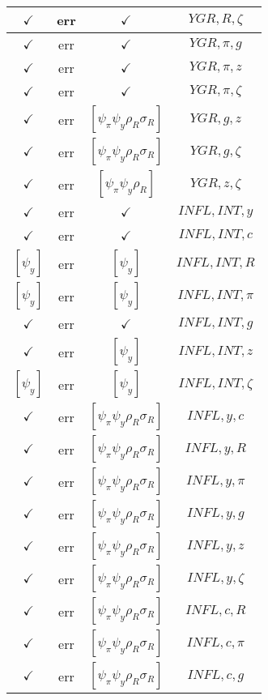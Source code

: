 \documentclass[a4paper,10pt]{article}
\begin{document}
\begin{longtable}{|c|c|c|c|}
\hline
$\checkmark$ & err & $\checkmark$ & ${YGR},{R},{\zeta}$ \\
\hline
$\checkmark$ & err & $\checkmark$ & ${YGR},{\pi},{g}$ \\
\hline
$\checkmark$ & err & $\checkmark$ & ${YGR},{\pi},{z}$ \\
\hline
$\checkmark$ & err & $\checkmark$ & ${YGR},{\pi},{\zeta}$ \\
\hline
$\checkmark$ & err & $[\psi_\pi \psi_y \rho_R \sigma_R ]$ & ${YGR},{g},{z}$ \\
\hline
$\checkmark$ & err & $[\psi_\pi \psi_y \rho_R \sigma_R ]$ & ${YGR},{g},{\zeta}$ \\
\hline
$\checkmark$ & err & $[\psi_\pi \psi_y \rho_R ]$ & ${YGR},{z},{\zeta}$ \\
\hline
$\checkmark$ & err & $\checkmark$ & ${INFL},{INT},{y}$ \\
\hline
$\checkmark$ & err & $\checkmark$ & ${INFL},{INT},{c}$ \\
\hline
$[\psi_y ]$ & err & $[\psi_y ]$ & ${INFL},{INT},{R}$ \\
\hline
$[\psi_y ]$ & err & $[\psi_y ]$ & ${INFL},{INT},{\pi}$ \\
\hline
$\checkmark$ & err & $\checkmark$ & ${INFL},{INT},{g}$ \\
\hline
$\checkmark$ & err & $[\psi_y ]$ & ${INFL},{INT},{z}$ \\
\hline
$[\psi_y ]$ & err & $[\psi_y ]$ & ${INFL},{INT},{\zeta}$ \\
\hline
$\checkmark$ & err & $[\psi_\pi \psi_y \rho_R \sigma_R ]$ & ${INFL},{y},{c}$ \\
\hline
$\checkmark$ & err & $[\psi_\pi \psi_y \rho_R \sigma_R ]$ & ${INFL},{y},{R}$ \\
\hline
$\checkmark$ & err & $[\psi_\pi \psi_y \rho_R \sigma_R ]$ & ${INFL},{y},{\pi}$ \\
\hline
$\checkmark$ & err & $[\psi_\pi \psi_y \rho_R \sigma_R ]$ & ${INFL},{y},{g}$ \\
\hline
$\checkmark$ & err & $[\psi_\pi \psi_y \rho_R \sigma_R ]$ & ${INFL},{y},{z}$ \\
\hline
$\checkmark$ & err & $[\psi_\pi \psi_y \rho_R \sigma_R ]$ & ${INFL},{y},{\zeta}$ \\
\hline
$\checkmark$ & err & $[\psi_\pi \psi_y \rho_R \sigma_R ]$ & ${INFL},{c},{R}$ \\
\hline
$\checkmark$ & err & $[\psi_\pi \psi_y \rho_R \sigma_R ]$ & ${INFL},{c},{\pi}$ \\
\hline
$\checkmark$ & err & $[\psi_\pi \psi_y \rho_R \sigma_R ]$ & ${INFL},{c},{g}$ \\

\end{longtable}
\end{document}
